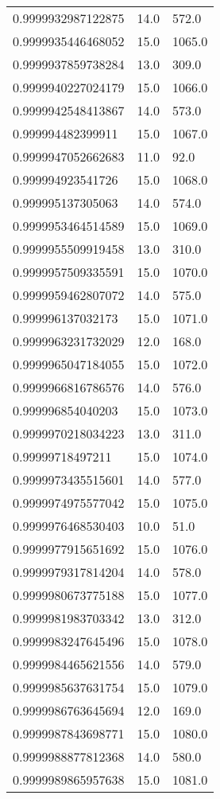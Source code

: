 \begin{center}
\begin{supertabular}[H]{p{0.30\textwidth}p{0.05\textwidth}p{0.05\textwidth}}
0.9999932987122875 & 14.0 & 572.0 \\ 
0.9999935446468052 & 15.0 & 1065.0 \\ 
0.9999937859738284 & 13.0 & 309.0 \\ 
0.9999940227024179 & 15.0 & 1066.0 \\ 
0.9999942548413867 & 14.0 & 573.0 \\ 
0.999994482399911 & 15.0 & 1067.0 \\ 
0.9999947052662683 & 11.0 & 92.0 \\ 
0.999994923541726 & 15.0 & 1068.0 \\ 
0.999995137305063 & 14.0 & 574.0 \\ 
0.9999953464514589 & 15.0 & 1069.0 \\ 
0.9999955509919458 & 13.0 & 310.0 \\ 
0.9999957509335591 & 15.0 & 1070.0 \\ 
0.9999959462807072 & 14.0 & 575.0 \\ 
0.999996137032173 & 15.0 & 1071.0 \\ 
0.9999963231732029 & 12.0 & 168.0 \\ 
0.9999965047184055 & 15.0 & 1072.0 \\ 
0.9999966816786576 & 14.0 & 576.0 \\ 
0.999996854040203 & 15.0 & 1073.0 \\ 
0.9999970218034223 & 13.0 & 311.0 \\ 
0.99999718497211 & 15.0 & 1074.0 \\ 
0.9999973435515601 & 14.0 & 577.0 \\ 
0.9999974975577042 & 15.0 & 1075.0 \\ 
0.9999976468530403 & 10.0 & 51.0 \\ 
0.9999977915651692 & 15.0 & 1076.0 \\ 
0.9999979317814204 & 14.0 & 578.0 \\ 
0.9999980673775188 & 15.0 & 1077.0 \\ 
0.9999981983703342 & 13.0 & 312.0 \\ 
0.9999983247645496 & 15.0 & 1078.0 \\ 
0.9999984465621556 & 14.0 & 579.0 \\ 
0.9999985637631754 & 15.0 & 1079.0 \\ 
0.9999986763645694 & 12.0 & 169.0 \\ 
0.9999987843698771 & 15.0 & 1080.0 \\ 
0.9999988877812368 & 14.0 & 580.0 \\ 
0.9999989865957638 & 15.0 & 1081.0 \\ 

\end{supertabular}
\end{center}
